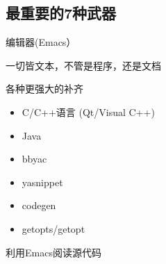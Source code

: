 \documentclass[presentation,dvipdfmx,CJKbookmarks]{beamer}
\begin{document}
\begin{CJK*}{UTF8}{simsun}
\section{最重要的7种武器}
\label{sec:org93cb08a}
\begin{frame}[label={sec:org0955fb3}]{编辑器(Emacs）}
\begin{block}{一切皆文本，不管是程序，还是文档}
\end{block}
\begin{block}{各种更强大的补齐}
\begin{itemize}
\item C/C++语言 (Qt/Visual C++)
\item Java
\item bbyac
\item yasnippet
\item codegen
\item getopts/getopt
\end{itemize}
\end{block}
\begin{block}{利用Emacs阅读源代码}
\end{block}
\end{frame}


\end{CJK*}
\end{document}
